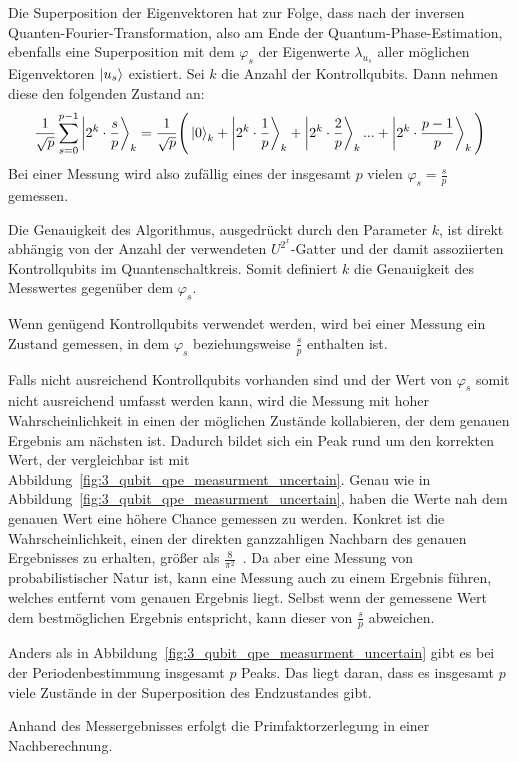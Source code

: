 Die Superposition der Eigenvektoren hat zur Folge, 
dass nach der inversen Quanten-Fourier-Transformation, also am Ende der Quantum-Phase-Estimation,
ebenfalls eine Superposition mit dem \(\varphi_s\) der Eigenwerte \(\lambda_{u_s}\) aller möglichen Eigenvektoren \(\ket{u_s}\) existiert.
Sei \(k\) die Anzahl der Kontrollqubits. 
Dann nehmen diese den folgenden Zustand an:
\[
    \frac{1}{\sqrt{p}} \sum_{s=0}^{p-1}\ket{2^k \cdot \frac{s}{p}}_k   = 
    \frac{1}{\sqrt{p}} \Bigg(\ket{0}_k  + \ket{2^k \cdot \frac{1}{p}}_k + \ket{2^k \cdot \frac{2}{p}}_k  ... + \ket{2^k \cdot \frac{p-1}{p}}_k \Bigg)
\]
Bei einer Messung wird also zufällig eines der insgesamt \(p\) vielen \(\varphi_s = \frac{s}{p}\) gemessen.

Die Genauigkeit des Algorithmus, ausgedrückt durch den Parameter \(k\),
ist direkt abhängig von der Anzahl der verwendeten \(U^{2^x}\)-Gatter
und der damit assoziierten Kontrollqubits im Quantenschaltkreis.
Somit definiert \(k\) die Genauigkeit des Messwertes gegenüber dem \(\varphi_s\).

Wenn genügend Kontrollqubits verwendet werden, 
wird bei einer Messung ein Zustand gemessen, 
in dem \(\varphi_s\) beziehungsweise \(\frac{s}{p}\) enthalten ist.

Falls nicht ausreichend Kontrollqubits vorhanden sind 
und der Wert von \(\varphi_s\) somit nicht ausreichend umfasst werden kann,
wird die Messung mit hoher Wahrscheinlichkeit 
in einen der möglichen Zustände kollabieren, 
der dem genauen Ergebnis am nächsten ist.
Dadurch bildet sich ein Peak rund um den korrekten Wert, 
der vergleichbar ist mit Abbildung~\ref{fig:3_qubit_qpe_measurment_uncertain}.
Genau wie in Abbildung~\ref{fig:3_qubit_qpe_measurment_uncertain}, haben die Werte nah dem genauen Wert
eine höhere Chance gemessen zu werden. 
Konkret ist die Wahrscheinlichkeit, 
einen der direkten ganzzahligen Nachbarn des genauen Ergebnisses zu erhalten, 
größer als \(\frac{8}{\pi^2}\)~\cite[119]{kaye2007introduction}.
Da aber eine Messung von probabilistischer Natur ist, 
kann eine Messung auch zu einem Ergebnis führen, 
welches entfernt vom genauen Ergebnis liegt.
Selbst wenn der gemessene Wert dem bestmöglichen Ergebnis entspricht, 
kann dieser von \(\frac{s}{p}\) abweichen. 

Anders als in Abbildung~\ref{fig:3_qubit_qpe_measurment_uncertain} gibt es bei der Periodenbestimmung insgesamt \(p\) Peaks.
Das liegt daran, dass es insgesamt \(p\) viele Zustände in der Superposition des Endzustandes gibt.

Anhand des Messergebnisses erfolgt die Primfaktorzerlegung in einer Nachberechnung.

